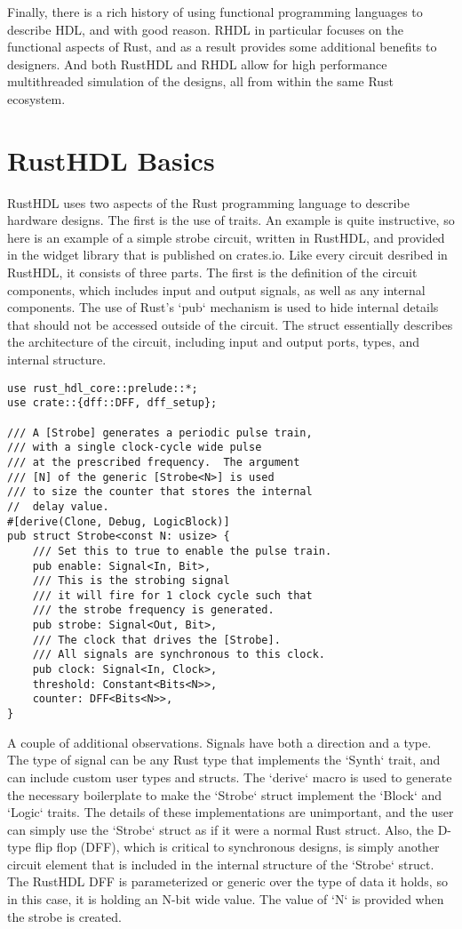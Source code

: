 \documentclass[conference]{IEEEtran}
\begin{document}
Finally, there is a rich history of using functional programming languages to describe HDL, and
with good reason.  RHDL in particular focuses on the functional aspects of Rust, and as a result 
provides some additional benefits to designers.  And both RustHDL and RHDL allow for high performance 
multithreaded simulation of the designs, all from within the same Rust ecosystem.

\section{RustHDL Basics}

RustHDL uses two aspects of the Rust programming language to describe hardware designs.  The first
is the use of traits.  An example is quite instructive, so here is an example of a simple strobe
circuit, written in RustHDL, and provided in the widget library that is published on crates.io.  Like 
every circuit desribed in RustHDL, it consists of three parts.  The first is the definition of the
circuit components, which includes input and output signals, as well as any internal components.
The use of Rust's `pub` mechanism is used to hide internal details that should not be accessed
outside of the circuit.  The struct essentially describes the architecture of the circuit, including
input and output ports, types, and internal structure.

\begin{verbatim}
use rust_hdl_core::prelude::*;
use crate::{dff::DFF, dff_setup};

/// A [Strobe] generates a periodic pulse train, 
/// with a single clock-cycle wide pulse
/// at the prescribed frequency.  The argument 
/// [N] of the generic [Strobe<N>] is used
/// to size the counter that stores the internal 
//  delay value.  
#[derive(Clone, Debug, LogicBlock)]
pub struct Strobe<const N: usize> {
    /// Set this to true to enable the pulse train.
    pub enable: Signal<In, Bit>,
    /// This is the strobing signal 
    /// it will fire for 1 clock cycle such that 
    /// the strobe frequency is generated.
    pub strobe: Signal<Out, Bit>,
    /// The clock that drives the [Strobe].  
    /// All signals are synchronous to this clock.
    pub clock: Signal<In, Clock>,
    threshold: Constant<Bits<N>>,
    counter: DFF<Bits<N>>,
}
\end{verbatim}

A couple of additional observations.  Signals have both a direction and a type.  The type of
signal can be any Rust type that implements the `Synth` trait, and can include custom user
types and structs.  The `derive` macro is used to generate the necessary boilerplate to make the 
`Strobe` struct implement the `Block` and `Logic` traits.  The details of these implementations are
unimportant, and the user can simply use the `Strobe` struct as if it were a normal Rust struct.  Also,
the D-type flip flop (DFF), which is critical to synchronous designs, is simply another circuit element that
is included in the internal structure of the `Strobe` struct.  The RustHDL DFF is parameterized or 
generic over the type of data it holds, so in this case, it is holding an N-bit wide value.  The value of
`N` is provided when the strobe is created.
\end{document}
